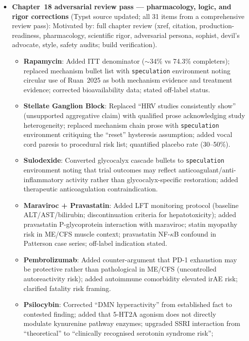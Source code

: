\begin{itemize}
  \item \textbf{Chapter~18 adversarial review pass --- pharmacology, logic, and rigor corrections}
    (Typst source updated; all 31 items from a comprehensive review pass):
    Motivated by: full chapter review (xref, citation, production-readiness, pharmacology, scientific rigor,
    adversarial persona, sophist, devil's advocate, style, safety audits; build verification).
    \begin{itemize}
      \item \textbf{Rapamycin}: Added ITT denominator ($\sim$34\% vs 74.3\% completers); replaced
        mechanism bullet list with \texttt{speculation} environment noting circular use of Ruan~2025
        as both mechanism evidence and treatment evidence; corrected bioavailability data; stated off-label status.
      \item \textbf{Stellate Ganglion Block}: Replaced ``HRV studies consistently show'' (unsupported
        aggregative claim) with qualified prose acknowledging study heterogeneity; replaced
        mechanism chain prose with \texttt{speculation} environment critiquing the ``reset'' hysteresis
        assumption; added vocal cord paresis to procedural risk list; quantified placebo rate (30--50\%).
      \item \textbf{Sulodexide}: Converted glycocalyx cascade bullets to \texttt{speculation} environment
        noting that trial outcomes may reflect anticoagulant/anti-inflammatory activity rather than
        glycocalyx-specific restoration; added therapeutic anticoagulation contraindication.
      \item \textbf{Maraviroc + Pravastatin}: Added LFT monitoring protocol (baseline ALT/AST/bilirubin;
        discontinuation criteria for hepatotoxicity); added pravastatin P-glycoprotein interaction with
        maraviroc; statin myopathy risk in ME/CFS muscle context; pravastatin NF-$\kappa$B confound in
        Patterson case series; off-label indication stated.
      \item \textbf{Pembrolizumab}: Added counter-argument that PD-1 exhaustion may be protective rather
        than pathological in ME/CFS (uncontrolled autoreactivity risk); added autoimmune comorbidity
        elevated irAE risk; clarified fatality risk framing.
      \item \textbf{Psilocybin}: Corrected ``DMN hyperactivity'' from established fact to contested finding;
        added that 5-HT2A agonism does not directly modulate kynurenine pathway enzymes; upgraded
        SSRI interaction from ``theoretical'' to ``clinically recognised serotonin syndrome risk'';

\end{itemize}
\end{itemize}
